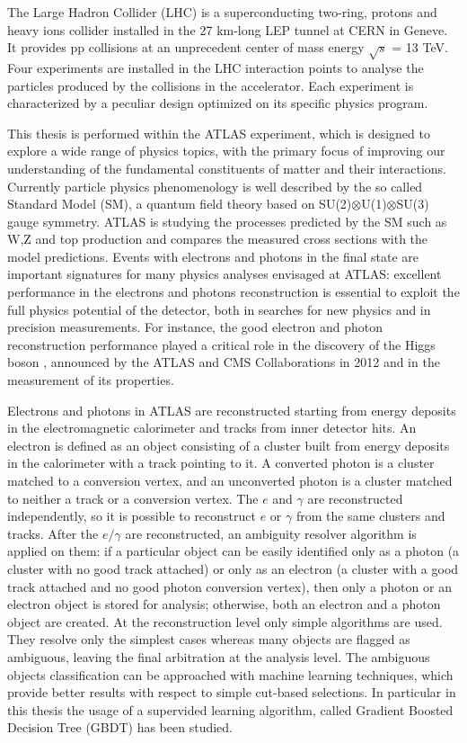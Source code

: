 \documentclass[a4paper, oneside, 11pt]{book}
\begin{document}
	The Large Hadron Collider (LHC) \cite{LHC} is a superconducting two-ring, protons and heavy ions collider installed in the 27 km-long LEP tunnel at CERN in Geneve. It provides pp collisions at an unprecedent center of mass energy $\sqrt{s}$ = 13 TeV. Four experiments are installed in the LHC interaction points to analyse the particles produced by the collisions in the accelerator. Each experiment is characterized by a peculiar design optimized on its specific physics program.
	
	This thesis is performed within the ATLAS \cite{ATLAS} experiment, which is designed to explore a wide range of physics topics, with the primary focus of improving our understanding of the fundamental constituents of matter and their interactions. Currently particle physics phenomenology is well described by the so called Standard Model (SM), a quantum field theory based on SU(2)$\otimes$U(1)$\otimes$SU(3) gauge symmetry. ATLAS is studying the processes predicted by the SM such as W,Z and top production and compares the measured cross sections with the model predictions. Events with electrons and photons in the final state are important signatures for many
	physics analyses envisaged at ATLAS: excellent performance in the electrons and photons reconstruction is essential to exploit the full physics potential of the detector, both in searches for new physics and in precision measurements. For instance, the good electron and photon reconstruction performance played a critical role in the discovery of the Higgs boson \cite{Higgs}, announced by the ATLAS and CMS \cite{CMS} Collaborations in 2012 and in the measurement of its properties.
	
	Electrons and photons in ATLAS are reconstructed starting from energy deposits in the electromagnetic calorimeter and tracks from inner detector hits. An electron is defined as an object consisting of a cluster built from energy deposits in the calorimeter with a track pointing to it. A converted photon is a cluster matched to a conversion vertex, and an unconverted photon is a cluster matched to neither a track or a conversion vertex. The $e$ and $\gamma$ are reconstructed independently, so it is possible to reconstruct $e$ or $\gamma$ from the same clusters and tracks. After the $e/\gamma$ are reconstructed, an ambiguity resolver algorithm is applied on them: if a particular object can be easily identified only as a photon (a cluster with no good track attached) or only as an electron (a cluster with a good track attached and no good photon conversion vertex), then only a photon or an electron object is stored for analysis; otherwise, both an electron and a photon object are created. At the reconstruction level only simple algorithms are used. They resolve only the simplest cases whereas many objects are flagged as ambiguous, leaving the final arbitration at the analysis level. The ambiguous objects classification can be approached with machine learning techniques, which provide better results with respect to simple cut-based selections. In particular in this thesis the usage of a supervided learning algorithm, called Gradient Boosted  Decision Tree (GBDT) has been studied.
	
\end{document}
